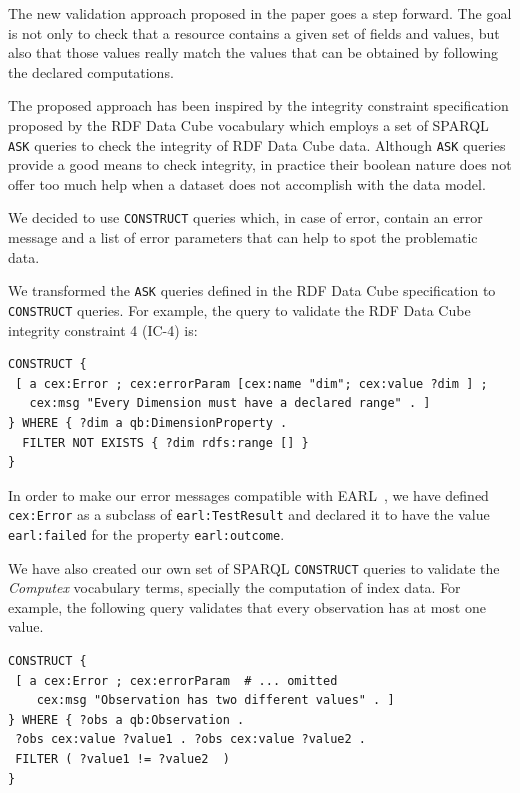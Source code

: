\documentclass{acm_proc_article-sp}
\begin{document}
The new validation approach proposed in the paper goes a step forward. 
The goal is not only to check that a resource contains
 a given set of fields and values, but also that those values really match
 the values that can be obtained by following the declared computations.
 
The proposed approach has been inspired by the integrity
constraint specification proposed by the RDF Data Cube vocabulary 
which employs a set of SPARQL
 \lstinline|ASK| queries to check the integrity of RDF Data Cube data. 
 Although \lstinline|ASK| queries provide a good means to check integrity, in
 practice their boolean nature does not offer too much help when a 
 dataset does not accomplish with the data model.

 We decided to use \lstinline|CONSTRUCT| queries which, in case of error, 
  contain an error message and a list of error parameters that can help to spot
  the problematic data.

 We transformed the \lstinline|ASK| queries defined in the RDF Data Cube
 specification to \lstinline|CONSTRUCT| queries. For example, the
 query to validate the RDF Data Cube integrity constraint 4 (IC-4) is:
 
\begin{lstlisting}[style=SPARQL]
CONSTRUCT {
 [ a cex:Error ; cex:errorParam [cex:name "dim"; cex:value ?dim ] ;
   cex:msg "Every Dimension must have a declared range" . ]
} WHERE { ?dim a qb:DimensionProperty .
  FILTER NOT EXISTS { ?dim rdfs:range [] }
}
\end{lstlisting}
 
In order to make our error messages compatible with EARL~\cite{EARL}, we have
 defined \lstinline|cex:Error| as a subclass of \lstinline|earl:TestResult| and 
 declared it to have the value \lstinline|earl:failed| for the property
 \lstinline|earl:outcome|.
 
We have also created our own set of SPARQL \lstinline|CONSTRUCT| queries to
validate the \emph{Computex} vocabulary terms, specially the computation of index data.
For example, the following query validates that every observation 
  has at most one value.
 
\begin{lstlisting}[style=SPARQL]
CONSTRUCT {
 [ a cex:Error ; cex:errorParam  # ... omitted 
    cex:msg "Observation has two different values" . ]
} WHERE { ?obs a qb:Observation . 
 ?obs cex:value ?value1 . ?obs cex:value ?value2 .
 FILTER ( ?value1 != ?value2  )
}
\end{lstlisting}
\end{document}
